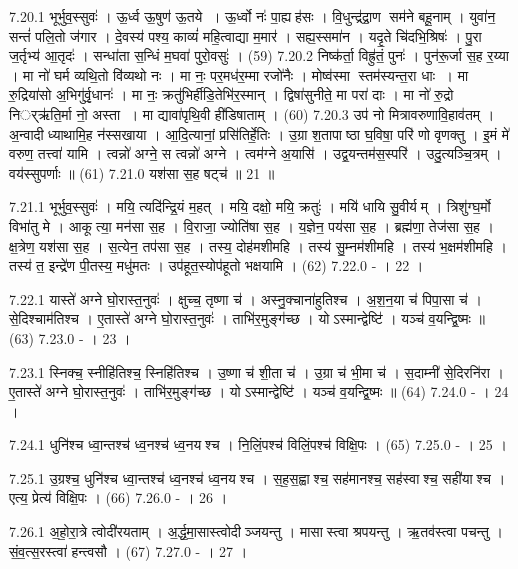 7.20.1
भूर्भुव॒स्सुवः॑ । ऊ॒र्ध्व ऊ॒षुण॑ ऊ॒तये । ऊ॒र्ध्वो नः॑ पा॒ह्यह॑सः । वि॒धुन्द्र॑द्रा॒ण सम॑ने बहू॒नाम् । युवा॑न॒ सन्तं॑ पलि॒तो ज॑गार । दे॒वस्य॑ पश्य॒ काव्यं॑ महि॒त्वाद्या म॒मार॑ । सह्य॒स्समा॑न । यदृ॒ते चि॑दभि॒श्रिषः॑ । पु॒रा ज॒र्तृभ्य॑ आ॒तृदः॑ । सन्धा॑ता स॒न्धिं म॒घवा॑ पुरो॒वसुः॑ । (59)
7.20.2
निष्क॑र्ता॒ विह्रु॑तं॒ पुनः॑ । पुन॑रू॒र्जा स॒ह र॒य्या । मा नो॑ घर्म व्यथि॒तो वि॑व्यथो नः । मा नः॒ पर॒मध॑र॒म्मा रजो॑नैः । मोष्व॑स्मा स्तम॑स्यन्त॒रा धाः । मा रु॒द्रिया॑सो अ॒भिगु॑र्वृ॒धानः॑ । मा नः॒ क्रतु॑भिर्\mbox{}हीडि॒तेभि॑र॒स्मान् । द्विषा॑सुनीते॒ मा परा॑ दाः । मा नो॑ रु॒द्रो निर््ऋ॑ति॒र्मा नो॒ अस्ता । मा द्यावा॑पृथि॒वी ही॑डिषाताम् । (60)
7.20.3
उप॑ नो मित्रावरुणावि॒हाव॑तम् । अ॒न्वादीध्याथामि॒ह न॑स्सखाया । आ॒दि॒त्यानां॒ प्रसि॑तिर्\mbox{}हे॒तिः । उ॒ग्रा श॒तापाष्ठा घ॒विषा॒ परि॑ णो वृणक्तु । इ॒मं मे॑ वरुण॒ तत्त्वा॑ यामि । त्वन्नो॑ अग्ने॒ स त्वन्नो॑ अग्ने । त्वम॑ग्ने अ॒यासि॑ । उद्व॒यन्तम॑स॒स्परि॑ । उदु॒त्यञ्चि॒त्रम् । वय॑स्सुपर्णाः ॥ (61)
7.21.0
यश॑सा स॒ह षट्च॑ ॥ 21 ॥
\anuvakamend

7.21.1
भूर्भुव॒स्सुवः॑ । मयि॒ त्यदि॑न्द्रि॒यं म॒हत् । मयि॒ दक्षो॒ मयि॒ क्रतुः॑ । मयि॑ धायि सु॒वीर्यम् । त्रिशु॑ग्घ॒र्मो विभा॑तु मे । आकूत्या॒ मन॑सा स॒ह । वि॒राजा॒ ज्योति॑षा स॒ह । य॒ज्ञेन॒ पय॑सा स॒ह । ब्रह्म॑णा॒ तेज॑सा स॒ह । क्ष॒त्रेण॒ यश॑सा स॒ह । स॒त्येन॒ तप॑सा स॒ह । तस्य॒ दोह॑मशीमहि । तस्य॑ सु॒म्नम॑शीमहि । तस्य॑ भ॒क्षम॑शीमहि । तस्य॑ त॒ इन्द्रे॑ण पी॒तस्य॒ मधु॑मतः । उप॑हूत॒स्योप॑हूतो भक्षयामि । (62)
7.22.0
- । 22 ।
\anuvakamend


7.22.1
यास्ते॑ अग्ने घो॒रास्त॒नुवः॑ । क्षुच्च॒ तृष्णा च॑ । अस्नु॒क्चाना॑हुतिश्च । अ॒श॒न॒या च॑ पिपा॒सा च॑ । से॒दिश्चाम॑तिश्च । ए॒तास्ते॑ अग्ने घो॒रास्त॒नुवः॑ । ताभि॑र॒मुङ्ग॑च्छ । योऽस्मान्द्वेष्टि॑ । यञ्च॑ व॒यन्द्वि॒ष्मः ॥ (63)
7.23.0
- । 23 ।
\anuvakamend

7.23.1
स्निक्च॒ स्नीहि॑तिश्च॒ स्निहि॑तिश्च । उ॒ष्णा च॑ शी॒ता च॑ । उ॒ग्रा च॑ भी॒मा च॑ । स॒दाम्नी॑ से॒दिरनि॑रा । ए॒तास्ते॑ अग्ने घो॒रास्त॒नुवः॑ । ताभि॑र॒मुङ्ग॑च्छ । योऽस्मान्द्वेष्टि॑ । यञ्च॑ व॒यन्द्वि॒ष्मः ॥ (64)
7.24.0
- । 24 ।
\anuvakamend

7.24.1
धुनि॑श्च ध्वा॒न्तश्च॑ ध्व॒नश्च॑ ध्व॒नयश्च । नि॒लिं॒पश्च॑ विलिं॒पश्च॑ विक्षि॒पः । (65)
7.25.0
- । 25 ।
\anuvakamend

7.25.1
उ॒ग्रश्च॒ धुनि॑श्च ध्वा॒न्तश्च॑ ध्व॒नश्च॑ ध्व॒नयश्च । स॒ह॒स॒ह्वाश्च॒ सह॑मानश्च॒ सह॑स्वाश्च॒ सही॑याश्च । एत्य॒ प्रेत्य॑ विक्षि॒पः । (66)
7.26.0
- । 26 ।
\anuvakamend

7.26.1
अ॒हो॒रा॒त्रे त्वोदी॑रयताम् । अ॒र्द्ध॒मा॒सास्त्वोदीञ्जयन्तु । मासास्त्वा श्रपयन्तु । ऋ॒तव॑स्त्वा पचन्तु । सं॒व॒त्स॒रस्त्वा॑ हन्त्वसौ । (67)
7.27.0
- । 27 ।
\anuvakamend

